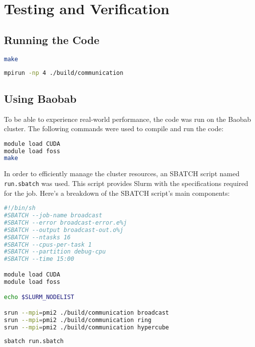 \documentclass[11pt]{article}
\begin{document}
\section{Testing and Verification}
\subsection{Running the Code}

\begin{lstlisting}[language=bash,caption=Compiling the code]
make 
\end{lstlisting}

\begin{lstlisting}[language=bash,caption=Running the code]
mpirun -np 4 ./build/communication
\end{lstlisting}

\subsection{Using Baobab}

To be able to experience real-world performance, the code was run on the Baobab cluster. The following commands were used to compile and run the code:

\begin{lstlisting}[language=bash,caption=Compiling the code]
module load CUDA
module load foss
make
\end{lstlisting}

In order to efficiently manage the cluster resources, an SBATCH script named \texttt{run.sbatch} was used. This script provides Slurm with the specifications required for the job. Here's a breakdown of the SBATCH script's main components:

\begin{lstlisting}[language=bash,caption=SBATCH script]
#!/bin/sh
#SBATCH --job-name broadcast          
#SBATCH --error broadcast-error.e%j   
#SBATCH --output broadcast-out.o%j    
#SBATCH --ntasks 16                   
#SBATCH --cpus-per-task 1             
#SBATCH --partition debug-cpu         
#SBATCH --time 15:00                 

module load CUDA
module load foss

echo $SLURM_NODELIST

srun --mpi=pmi2 ./build/communication broadcast
srun --mpi=pmi2 ./build/communication ring
srun --mpi=pmi2 ./build/communication hypercube
\end{lstlisting}

\begin{lstlisting}[language=bash,caption=Running the code]
sbatch run.sbatch
\end{lstlisting}
\end{document}
